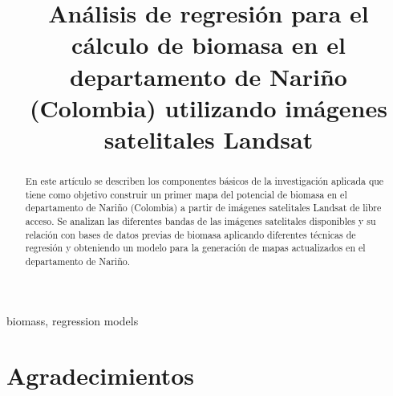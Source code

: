 \documentclass[conference, spanish]{IEEEtran}
\begin{document}
\pagestyle{empty}  

\title{Análisis de regresión para el cálculo de biomasa en el departamento de Nariño (Colombia) utilizando imágenes satelitales Landsat}

\author{
\and
{}
}

\maketitle

\begin{abstract}

En este artículo se describen los componentes básicos de la investigación aplicada que tiene como objetivo construir un primer mapa del potencial de biomasa en el departamento de Nariño (Colombia) a partir de imágenes satelitales Landsat de libre acceso. Se analizan las diferentes bandas de las imágenes satelitales disponibles y su relación con bases de datos previas de biomasa aplicando diferentes técnicas de regresión y obteniendo un modelo para la generación de mapas actualizados en el departamento de Nariño.

\end{abstract}


\begin{IEEEkeywords}
biomass, regression models 
\end{IEEEkeywords}

\thispagestyle{empty} 

\IEEEpeerreviewmaketitle





%




\ifCLASSOPTIONcompsoc
  \section*{Agradecimientos}
\else
\end{document}
